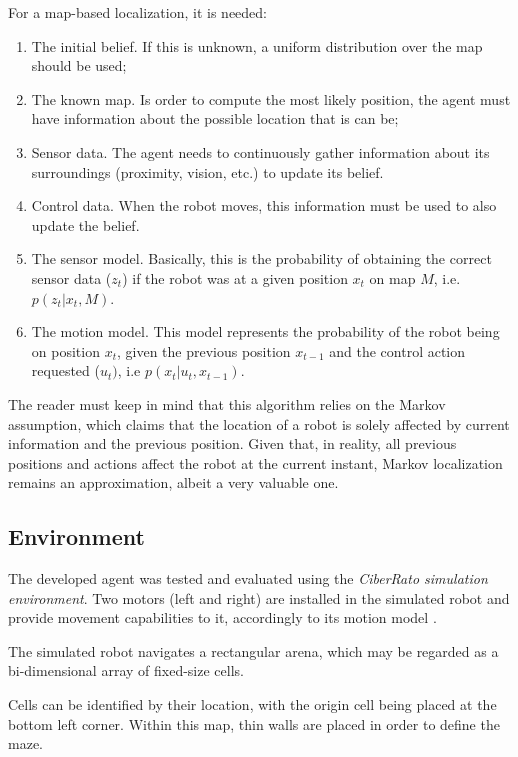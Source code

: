 \documentclass[runningheads]{llncs}
\begin{document}
For a map-based localization, it is needed:

\begin{enumerate}
    \item The initial belief. If this is unknown, a uniform distribution over the map should be used;
    \item The known map. Is order to compute the most likely position, the agent must have information about the possible location that is can be;
    \item Sensor data. The agent needs to continuously gather information about its surroundings (proximity, vision, etc.) to update its belief.
    \item Control data. When the robot moves, this information must be used to also update the belief. 
    \item The sensor model. Basically, this is the probability of obtaining the correct sensor data ($z_t$) if the robot was at a given position $x_t$ on map $M$, i.e. $p(z_t \vert x_t, M)$.
    \item The motion model. This model represents the probability of the robot being on position $x_t$, given the previous position $x_{t-1}$ and the control action requested ($u_t)$, i.e $p(x_t \vert u_t, x_{t-1})$.
\end{enumerate}

The reader must keep in mind that this algorithm relies on the Markov assumption, which claims that the location of a robot is solely affected by current information and the previous position. Given that, in reality, all previous positions and actions affect the robot at the current instant, Markov localization remains an approximation, albeit a very valuable one.

\subsection{Environment}
\label{subsec:environment}

The developed agent was tested and evaluated using the \emph{CiberRato simulation environment}. Two motors (left and right) are installed in the simulated robot and provide movement capabilities to it, accordingly to its motion model \cite{nuno_lau_2021}.

The simulated robot navigates a rectangular arena, which may be regarded as a bi-dimensional array of fixed-size cells.

Cells can be identified by their location, with the origin cell being placed at the bottom left corner. Within this map, thin walls are placed in order to define the maze.
\end{document}
